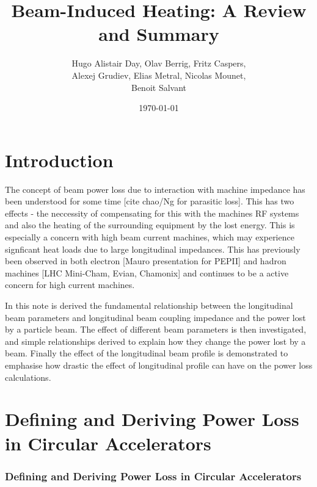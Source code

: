\documentclass[12pt,a4paper,twopage,openright]{report}
\begin{document}
\title{Beam-Induced Heating: A Review and Summary}
\date{\today}
\author{Hugo Alistair Day, Olav Berrig, Fritz Caspers, \\ Alexej Grudiev, Elias Metral, Nicolas Mounet, \\ Benoit Salvant}


\maketitle
\titlepage





\tableofcontents

\section{Introduction}

The concept of beam power loss due to interaction with machine impedance has been understood for some time [cite chao/Ng for parasitic loss]. This has two effects - the neccessity of compensating for this with the machines RF systems and also the heating of the surrounding equipment by the lost energy. This is especially a concern with high beam current machines, which may experience signficant heat loads due to large longitudinal impedances. This has previously been observed in both electron [Mauro presentation for PEPII] and hadron machines [LHC Mini-Cham, Evian, Chamonix]  and continues to be a active concern for high current machines. 

In this note is derived the fundamental relationship between the longitudinal beam parameters and longitudinal beam coupling impedance and the power lost by a particle beam. The effect of different beam parameters is then investigated, and simple relationships derived to explain how they change the power lost by a beam. Finally the effect of the longitudinal beam profile is demonstrated to emphasise how drastic the effect of longitudinal profile can have on the power loss calculations.

\section{Defining and Deriving Power Loss in Circular Accelerators}
\label{sec:power_loss}

\subsubsection{Defining and Deriving Power Loss in Circular Accelerators}
\label{sec:power_loss}
\end{document}

